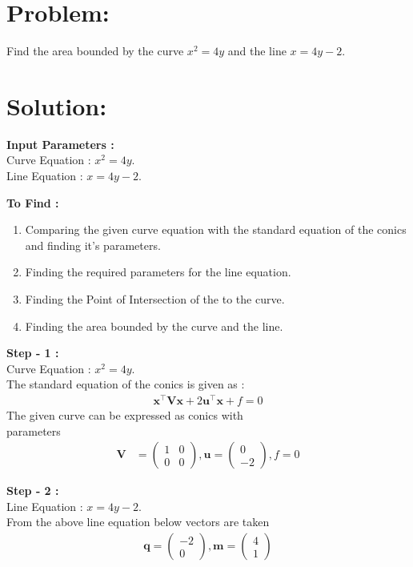 \documentclass[10pt,a4paper]{report}
\newcommand{\myvec}[1]{\ensuremath{\begin{pmatrix}#1\end{pmatrix}}}
\let\vec\mathbf
\begin{document}
\begin{multicols}{2}

\section{Problem:}  
Find the area bounded by the curve $x^2=4y$ and the line $x=4y-2$.

\section{Solution: }
\raggedright \textbf{Input Parameters :}\\ \vspace{2mm}
\centering Curve Equation : $x^2=4y$. \\ \vspace{1mm}
Line Equation : $x=4y-2$.\\
\vspace{3mm}

\raggedright \textbf{To Find :}\\ \vspace{2mm}
\begin{enumerate}
\item Comparing the given curve equation with the standard equation of the conics and finding it's parameters.
\item Finding the required parameters for the line equation.
\item Finding the Point of Intersection of the to the curve.
\item Finding the area bounded by the curve and the line.
\end{enumerate}

\raggedright \textbf{Step - 1 :}\\ \vspace{2mm}
Curve Equation : $x^2=4y$. \\ \vspace{1mm}
The standard equation of the conics is given as :
\begin{align}
\vec{x}^{\top}\vec{V}\vec{x}+2\vec{u}^{\top}\vec{x}+f=0
\end{align}
The given curve  can be expressed as conics with \\parameters
\begin{align}
	\vec{V} &= \myvec{1 & 0\\0 & 0}, \vec{u} = \myvec{0 \\-2}, f = 0
	\end{align}

\raggedright \textbf{Step - 2 :}\\ \vspace{2mm}
Line Equation : $x=4y-2$. \\ \vspace{1mm}
From the above line equation below vectors are taken
\begin{align}
\vec{q} = \myvec{-2 \\0} , \vec{m}=\myvec{4\\1}
\end{align}


\end{multicols}
\end{document}
